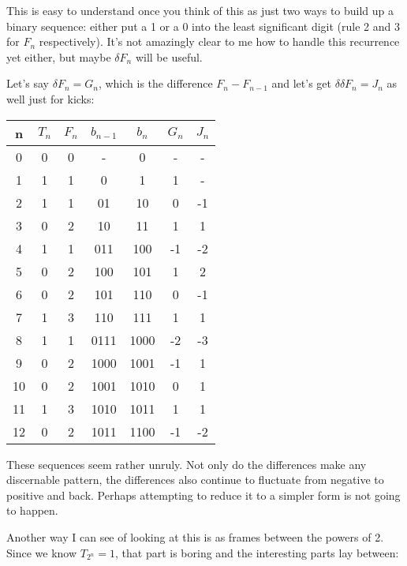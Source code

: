 \documentclass{article}
\begin{document}
This is easy to understand once you think of this as just two ways to build up a binary sequence: either put a 1 or a 0 into the least significant digit (rule 2 and 3 for $F_n$ respectively).  It's not amazingly clear to me how to handle this recurrence yet either, but maybe $\delta F_n$ will be useful.

\par

Let's say $\delta F_n = G_n$, which is the difference $F_n - F_{n - 1}$ and let's get $\delta\delta F_n = J_n$ as well just for kicks:
\begin{center}
    \begin{tabular}{c | c | c | c | c | c | c}
        n & $T_n$ & $F_n$ & $b_{n-1}$ & $b_{n}$ & $G_n$ & $J_n$ \\
        \hline
        0 & 0 & 0 & - & 0 & - & - \\
        1 & 1 & 1 & 0 & 1 & 1 & - \\
        2 & 1 & 1 & 01 & 10 & 0 & -1 \\
        3 & 0 & 2 & 10 & 11 & 1 & 1 \\
        4 & 1 & 1 & 011 & 100 & -1 & -2 \\
        5 & 0 & 2 & 100 & 101 & 1 & 2 \\
        6 & 0 & 2 & 101 & 110 & 0 & -1 \\
        7 & 1 & 3 & 110 & 111 & 1 & 1 \\
        8 & 1 & 1 & 0111 & 1000 & -2 & -3 \\
        9 & 0 & 2 & 1000 & 1001 & -1 & 1 \\
        10 & 0 & 2 & 1001 & 1010 & 0 & 1 \\
        11 & 1 & 3 & 1010 & 1011 & 1 & 1 \\
        12 & 0 & 2 & 1011 & 1100 & -1 & -2 \\
    \end{tabular}
\end{center}

These sequences seem rather unruly.  Not only do the differences make any discernable pattern, the differences also continue to fluctuate from negative to positive and back.  Perhaps attempting to reduce it to a simpler form is not going to happen.

\par

Another way I can see of looking at this is as frames between the powers of 2.  Since we know $T_{2^n} = 1$, that part is boring and the interesting parts lay between:
\end{document}
